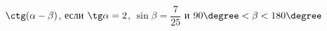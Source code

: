 \begin{ex}[type=simplify_calculate]
	\begin{condition}
		\( \ctg(\alpha-\beta) \), \quad если \( \tg\alpha=2 \), \( \sin\beta=\dfrac{7}{25} \) и \( 90\degree<\beta<180\degree \)
	\end{condition}
\end{ex}